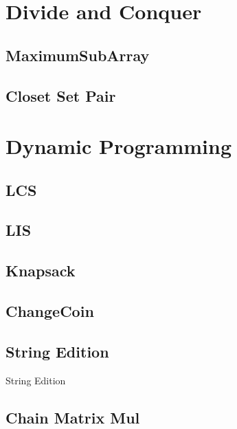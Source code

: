 \section{Divide and Conquer}

\subsection{MaximumSubArray}


\subsection{Closet Set Pair}

\section{Dynamic Programming}

\subsection{LCS}


\subsection{LIS}


\subsection{Knapsack}


\subsection{ChangeCoin}


\subsection{String Edition}

String Edition
\subsection{Chain Matrix Mul}

